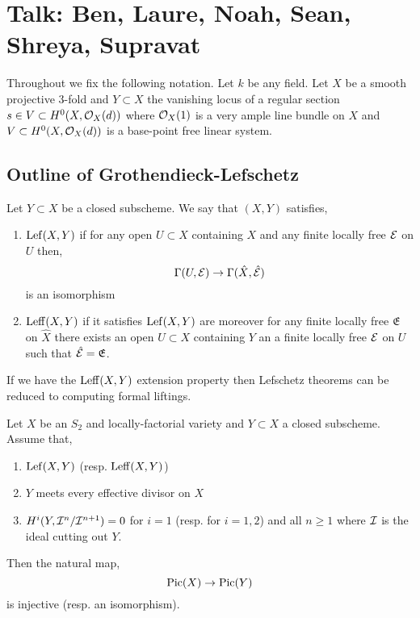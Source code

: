 \documentclass[12pt]{article}
\begin{document}
\newpage

\section{Talk: Ben, Laure, Noah, Sean, Shreya, Supravat}

Throughout we fix the following notation. Let $k$ be any field. Let $X$ be a smooth projective 3-fold and $Y \subset X$ the vanishing locus of a regular section $s \in V \subset H^0(X, \mathcal{O}_{X}(d))$ where $\mathcal{O}_{X}(1)$ is a very ample line bundle on $X$ and $V \subset H^0(X, \mathcal{O}_{X}(d))$ is a base-point free linear system. 

\subsection{Outline of Grothendieck-Lefschetz}

\begin{defn}
Let $Y \subset X$ be a closed subscheme. We say that $(X, Y)$ satisfies,
\begin{enumerate}
\item $\mathrm{Lef}(X,Y)$ if for any open $U \subset X$ containing $X$ and any finite locally free $\mathcal{E}$ on $U$ then,
\[ \Gamma(U, \mathcal{E}) \to \Gamma(\hat{X}, \hat{\mathcal{E}}) \]
is an isomorphism
\item $\mathrm{Leff}(X,Y)$ if it satisfies $\mathrm{Lef}(X,Y)$ are moreover for any finite locally free $\mathfrak{E}$ on $\hat{X}$ there exists an open $U \subset X$ containing $Y$ an a finite locally free $\mathcal{E}$ on $U$ such that $\hat{\mathcal{E}} = \mathfrak{E}$.
\end{enumerate}
\end{defn}

If we have the $\mathrm{Leff}(X, Y)$ extension property then Lefschetz theorems can be reduced to computing formal liftings.

\begin{theorem}
Let $X$ be an $S_2$ and locally-factorial variety and $Y \subset X$ a closed subscheme. Assume that,
\begin{enumerate}
\item $\mathrm{Lef}(X, Y)$ (resp. $\mathrm{Leff}(X,Y)$)
\item $Y$ meets every effective divisor on $X$
\item $H^i(Y, \mathcal{I}^n / \mathcal{I}^{n+1}) = 0$ for $i = 1$ (resp. for $i = 1,2$) and all $n \ge 1$ where $\mathcal{I}$ is the ideal cutting out $Y$.
\end{enumerate}
Then the natural map,
\[ \mathrm{Pic}(X) \to \mathrm{Pic}(Y) \]
is injective (resp. an isomorphism).
\end{theorem}
\end{document}

